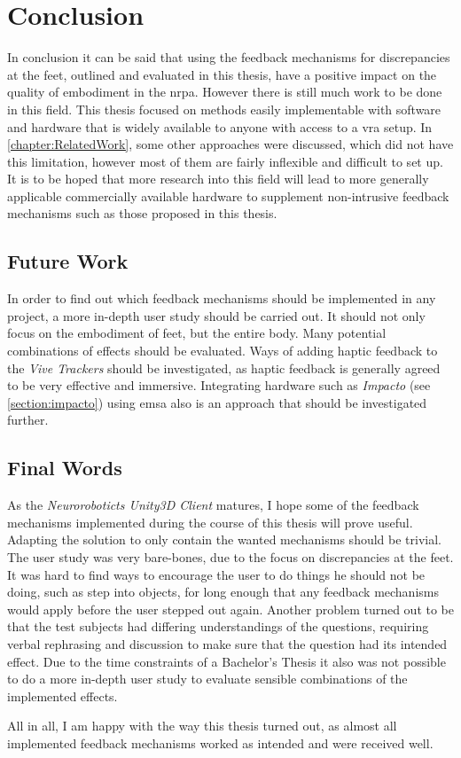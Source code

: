 
\chapter{Conclusion}

In conclusion it can be said that using the feedback mechanisms for discrepancies at the feet, outlined and evaluated in this thesis, have a positive impact on the quality of embodiment in the \gls{nrpa}. However there is still much work to be done in this field. This thesis focused on methods easily implementable with software and hardware that is widely available to anyone with access to a \gls{vra} setup. In \autoref{chapter:RelatedWork}, some other approaches were discussed, which did not have this limitation, however most of them are fairly inflexible and difficult to set up. It is to be hoped that more research into this field will lead to more generally applicable commercially available hardware to supplement non-intrusive feedback mechanisms such as those proposed in this thesis.


\section{Future Work}

In order to find out which feedback mechanisms should be implemented in any project, a more in-depth user study should be carried out. It should not only focus on the embodiment of feet, but the entire body. Many potential combinations of effects should be evaluated.
\newline
Ways of adding haptic feedback to the \textit{Vive Trackers} should be investigated, as haptic feedback is generally agreed to be very effective and immersive.
\newline
Integrating hardware such as \textit{Impacto} (see \autoref{section:impacto}) using \gls{emsa} also is an approach that should be investigated further.


\section{Final Words}

As the \textit{Neuroroboticts Unity3D Client} matures, I hope some of the feedback mechanisms implemented during the course of this thesis will prove useful. Adapting the solution to only contain the wanted mechanisms should be trivial.
\newline
The user study was very bare-bones, due to the focus on discrepancies at the feet. It was hard to find ways to encourage the user to do things he should not be doing, such as step into objects, for long enough that any feedback mechanisms would apply before the user stepped out again. Another problem turned out to be that the test subjects had differing understandings of the questions, requiring verbal rephrasing and discussion to make sure that the question had its intended effect.
\newline
Due to the time constraints of a Bachelor's Thesis it also was not possible to do a more in-depth user study to evaluate sensible combinations of the implemented effects.
\newline

All in all, I am happy with the way this thesis turned out, as almost all implemented feedback mechanisms worked as intended and were received well.